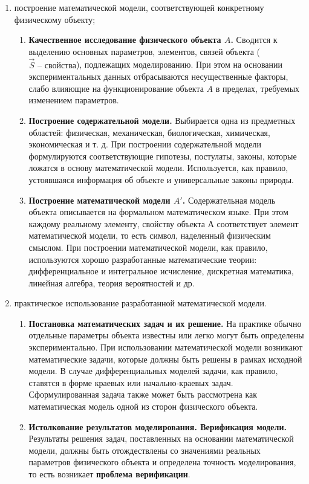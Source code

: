 \documentclass[a4paper, 12pt]{report}
\numberwithin{equation}{section}
\begin{document}
	\begin{enumerate}
		\item построение   математической   модели, соответствующей конкретному физическому объекту;
		\begin{enumerate}
			\item \textbf{Качественное исследование физического объекта $A$.} Свoдится к выделению основных параметров, элементов, связей объекта ($\vec{S} \text{ -- свойства}$), подлежащих моделированию. При этом на основании экспериментальных данных отбрасываются несущественные факторы, слабо влияющие на функционирование объекта $A$ в пределах, требуемых изменением параметров.
			\item \textbf{Построение содержательной модели.} Выбирается одна из предметных областей: физическая, механическая, биологическая, химическая, экономическая и т. д. При построении содержательной модели формулируются соответствующие гипотезы, постулаты, законы, которые ложатся в основу математической модели. Используется, как правило, устоявшаяся информация об объекте и универсальные законы природы.
			\item \textbf{Построение математической модели $A'$.} Содержательная модель объекта описывается на формальном математическом языке. При этом каждому реальному элементу, свойству объекта $А$ соответствует элемент математической модели, то есть символ, наделенный физическим смыслом. При построении математической модели, как правило, используются хорошо разработанные математические теории: дифференциальное и интегральное исчисление, дискретная математика, линейная  алгебра, теория вероятностей и др.
		\end{enumerate}
		\item практическое использование разработанной математической модели.
		\begin{enumerate}
			\item \textbf{Постановка математических задач и их решение.} На
			практике обычно отдельные параметры объекта известны или легко
			могут быть определены экспериментально. При использовании математической
			модели возникают математические задачи, которые должны быть
			решены в рамках исходной модели. В случае дифференциальных
			моделей задачи, как правило, ставятся в форме краевых или начально-краевых задач. Сформулированная задача также может быть рассмотрена как математическая модель одной из сторон физического объекта.
			\item \textbf{Истолкование результатов моделирования. Верификация модели.} Результаты решения задач, поставленных на основании математической модели, должны быть отождествлены со значениями реальных параметров физического объекта и определена точность моделирования, то есть возникает \textbf{проблема верификации}. 

\end{enumerate}
\end{enumerate}
\end{document}
